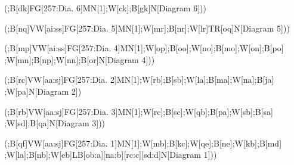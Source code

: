 (;B{[}dk{]}FG{[}257:Dia. 6{]}MN{[}1{]};W{[}ck{]};B{[}gk{]}N{[}Diagram
6{]}))

(;B{[}nq{]}VW{[}ai:ss{]}FG{[}257:Dia.
5{]}MN{[}1{]};W{[}mr{]};B{[}nr{]};W{[}lr{]}TR{[}oq{]}N{[}Diagram 5{]}))

(;B{[}mp{]}VW{[}ai:ss{]}FG{[}257:Dia.
4{]}MN{[}1{]};W{[}op{]};B{[}oo{]};W{[}no{]};B{[}mo{]};W{[}on{]};B{[}po{]}
;W{[}mn{]};B{[}np{]};W{[}nn{]};B{[}or{]}N{[}Diagram 4{]}))

(;B{[}rc{]}VW{[}aa:sj{]}FG{[}257:Dia.
2{]}MN{[}1{]};W{[}rb{]};B{[}sb{]};W{[}la{]};B{[}ma{]};W{[}na{]};B{[}ja{]}
;W{[}pa{]}N{[}Diagram 2{]})

(;B{[}rb{]}VW{[}aa:sj{]}FG{[}257:Dia.
3{]}MN{[}1{]};W{[}rc{]};B{[}sc{]};W{[}qb{]};B{[}pa{]};W{[}sb{]};B{[}sa{]}
;W{[}sd{]};B{[}qa{]}N{[}Diagram 3{]}))

(;B{[}qf{]}VW{[}aa:sj{]}FG{[}257:Dia.
1{]}MN{[}1{]};W{[}mb{]};B{[}kc{]};W{[}qe{]};B{[}ne{]};W{[}kb{]};B{[}md{]}
;W{[}la{]};B{[}nb{]};W{[}eb{]}LB{[}ob:a{]}{[}na:b{]}{[}rc:c{]}{[}sd:d{]}N{[}Diagram
1{]}))

\newpage
